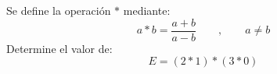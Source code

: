 Se define la operación  $*$  mediante:
$$
a*b=\frac{a+b}{a-b} \qquad ,\qquad  a\neq b
$$
Determine el valor de:
$$
E=(2*1)*(3*0)
$$
